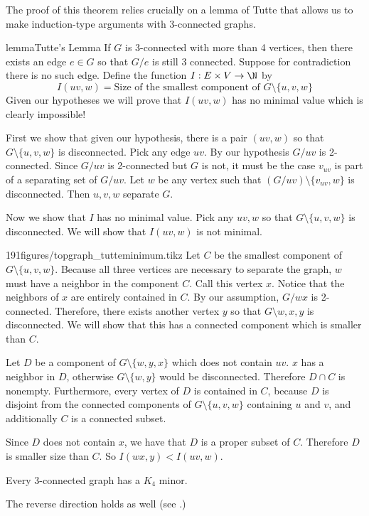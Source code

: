  The proof of this theorem relies crucially on a lemma of Tutte that allows us to make induction-type arguments with 3-connected graphs.
\begin{framedpage}{lemma}{Tutte's Lemma}{
  If $G$  is 3-connected with more than 4 vertices, then there exists an edge $e\in G$ so that $G/e$ is still 3 connected.}
  Suppose for contradiction there is no such edge. Define the function $I: E\times V \to \N$ by
  \[
   I(uv, w)=\text{Size of the smallest component of $G\setminus \{u,v, w\}$}
  \]
	Given our hypotheses we will prove that $I(uv, w)$ has no minimal value which is clearly impossible!

First we show that given our hypothesis, there is a pair $(uv, w)$ so that $G\setminus\{u, v, w\}$ is disconnected. Pick any edge $uv$. By our hypothesis $G/uv$ is   2-connected. Since $G/uv$ is 2-connected but $G$ is not, it must be the case $v_{uv}$ is part of a separating set of $G/uv$. Let $w$ be any vertex such that $(G/uv)\setminus\{v_{uv}, w\}$ is disconnected. Then $u, v, w$ separate $G$.

Now we show that  $I$ has no minimal value.
Pick any $uv, w$ so that $G\setminus\{u, v, w\}$ is disconnected. 
We will show that $I(uv, w)$ is not minimal.
\begin{paragraphfigureenv}{191figures/topgraph_tutteminimum.tikz}
	Let $C$ be the smallest component of $G\setminus\{u, v, w\}$. Because all three vertices are necessary to separate the graph,  $w$ must have a neighbor in the component $C$. Call this vertex $x$. Notice that the neighbors of $x$ are entirely contained in $C$.
	By our assumption, $G/wx$ is 2-connected.
	Therefore, there exists another vertex $y$ so that $G\setminus{w, x, y}$ is disconnected. We will show that this has a connected component which is smaller than $C$.

	Let $D$ be a component of $G\setminus\{w, y, x\}$ which does not contain $uv$. 
	$x$ has a neighbor in $D$, otherwise $G\setminus\{w, y\}$ would be disconnected.
	Therefore $D\cap C$ is nonempty. 
	Furthermore, every vertex of $D$ is contained in $C$, because $D$ is disjoint from the connected components of $G\setminus\{u,v,w\}$ containing $u$ and $v$, and additionally $C$ is a connected subset.
\end{paragraphfigureenv}
  Since $D$ does not contain $x$, we have that $D$ is a proper subset of $C$. Therefore $D$ is smaller size than $C$.  So $I(wx, y)<I(uv, w)$.
  
	\begin{corollary}
		Every 3-connected graph has a $K_4$ minor. 
	\end{corollary}
	The reverse direction holds as well (see .)
\end{framedpage}
